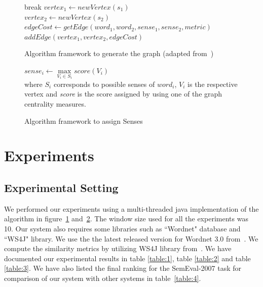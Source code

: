 \documentclass[12pt,letterpaper]{article}
\begin{document}
\begin{figure}[H] 
\begin{algorithm}[H]
{
	{
		{
			break
		}
		\Else
		{
			{
				{
					$vertex_1 \gets newVertex(s_1)$ \\
					$vertex_2 \gets newVertex(s_2)$ \\
					$edgeCost \gets getEdge(word_1,word_2,sense_1,sense_2,metric)$  \\
					$addEdge(vertex_1,vertex_2,edgeCost)$
				}	
			}
		}
	}
}
\end{algorithm}
\caption{Algorithm framework to generate the graph (adapted from~\cite{Sinha})}
\label{fig:2}
\end{figure}

\begin{figure}[H]
\begin{algorithm}[H]
{
	$sense_i\gets \max\limits_{V_i \in S_i} score(V_i)$ \\
	where $S_i$ corresponds to possible senses of $word_i$, $V_i$ is the respective vertex and \textit{score} is the score assigned by using one of the graph centrality measures.
}
\end{algorithm}
\caption{Algorithm framework to assign Senses}
\label{fig:3}
\end{figure}

\section{Experiments}
\label{sec:experiments}

\subsection{Experimental Setting}
We performed our experiments using a multi-threaded java implementation of the algorithm in figure~\ref{fig:2} and~\ref{fig:3}. The window size used for all the experiments was 10. Our system also requires some libraries such as ``Wordnet" database and ``WS4J" library. We use the the latest released version for Wordnet 3.0 from~\cite{wordneturl}. We compute the similarity metrics by utilizing WS4J library from~\cite{WS4Jurl}. We have documented our experimental results in table \ref{table:1}, table \ref{table:2} and table \ref{table:3}. We have also listed the final ranking for the SemEval-2007 task for comparison of our system with other systems in table~\ref{table:4}.
\end{document}
